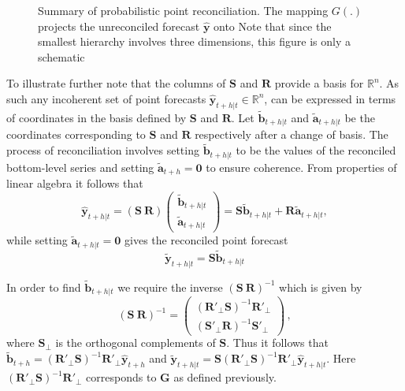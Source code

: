 \documentclass[a4paper, 11pt]{article}
\theoremstyle{theo}
\theoremstyle{definition}
\begin{document}
\begin{figure}
	
	\caption{Summary of probabilistic point reconciliation.  The mapping $G(.)$ projects the unreconciled forecast $\hat{\bm y}$ onto   Note that since the smallest hierarchy involves three dimensions, this figure is only a schematic}\label{fig:pointfr_sch} 
\end{figure}

To illustrate further note that the columns of $\bm{S}$ and $\bm{R}$ provide a basis for $\mathbb{R}^n$.  As such any incoherent set of point forecasts $\hat{\bm{y}}_{t+h|t} \in \mathbb{R}^n$, can be expressed in terms of coordinates in the basis defined by $\bm{S}$ and $\bm{R}$. Let $\tilde{\bm{b}}_{t+h|t}$ and $\tilde{\bm{a}}_{t+h|t}$ be the coordinates corresponding to $\bm{S}$ and $\bm{R}$ respectively after a change of basis. The process of reconciliation involves setting $\tilde{\bm{b}}_{t+h|t}$ to be the values of the reconciled bottom-level series and setting $\tilde{\bm{a}}_{t+h}=\bm{0}$ to ensure coherence. From properties of linear algebra it follows that 
\[
\hat{\bm{y}}_{t+h|t} = (\bm{S} ~ \bm{R})
\begin{pmatrix}
\tilde{\bm{b}}_{t+h|t}\\ \tilde{\bm{a}}_{t+h|t}
\end{pmatrix}= \bm{S}\tilde{\bm{b}}_{t+h|t} +  \bm{R}\tilde{\bm{a}}_{t+h|t},
\]
while setting $\tilde{\bm{a}}_{t+h|t}=\bm{0}$ gives the reconciled point forecast
\[
\tilde{\bm{y}}_{t+h|t} = \bm{S}\tilde{\bm{b}}_{t+h|t}
\]


In order to find $\tilde{\bm{b}}_{t+h|t}$ we require the inverse $(\bm{S} ~ \bm{R})^{-1}$ which is given by
\begin{equation}
(\bm{S} ~  \bm{R})^{-1} = \begin{pmatrix}
(\bm{R}'_\bot \bm{S})^{-1}\bm{R}'_\bot \\ (\bm{S}'_\bot \bm{R})^{-1}\bm{S}'_\bot
\end{pmatrix}\,,
\end{equation}
where $\bm{S}_{\bot}$ is the orthogonal complements of $\bm{S}$. Thus it follows that $\tilde{\bm{b}}_{t+h}=(\bm{R}'_\bot \bm{S})^{-1}\bm{R}'_\bot \hat{\bm{y}}_{t+h}$ and $\tilde{\bm{y}}_{t+h|t}=\bm{S}(\bm{R}'_\bot \bm{S})^{-1}\bm{R}'_\bot \hat{\bm{y}}_{t+h|t}$.  Here $(\bm{R}'_\bot \bm{S})^{-1}\bm{R}'_\bot$ corresponds to $\bm{G}$ as defined previously.
\end{document}
